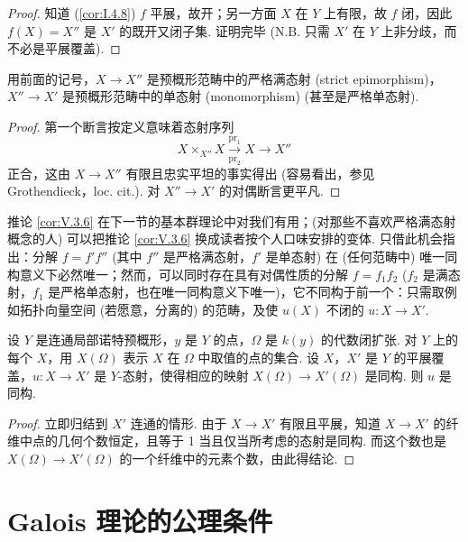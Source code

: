 \begin{proof}
知道 (\ref{cor:I.4.8}) $f$ 平展，故开；另一方面 $X$ 在 $Y$ 上有限，故 $f$ 闭，因此 $f(X) = X''$ 是 $X'$ 的既开又闭子集. 证明完毕 (N.B. 只需 $X'$ 在 $Y$ 上非分歧，而不必是平展覆盖).
\end{proof}

\begin{corollary}\label{cor:V.3.6}
用前面的记号，$X \to X''$ 是预概形范畴中的严格满态射 (strict epimorphism)，$X'' \to X'$ 是预概形范畴中的单态射 (monomorphism) (甚至是严格单态射).
\end{corollary}

\begin{proof}
第一个断言按定义意味着态射序列
\[
X \times_{X''} X \xrightarrow[\mathrm{pr}_2]{\mathrm{pr}_1} X \longrightarrow X''
\]
正合，这由 $X \to X''$ 有限且忠实平坦的事实得出 (容易看出，参见 Grothendieck，loc. cit.). 对 $X'' \to X'$ 的对偶断言更平凡.
\end{proof}

推论 \ref{cor:V.3.6} 在下一节的基本群理论中对我们有用；(对那些不喜欢严格满态射概念的人) 可以把推论 \ref{cor:V.3.6} 换成读者按个人口味安排的变体. 只借此机会指出：分解 $f = f'f''$ (其中 $f''$ 是严格满态射，$f'$ 是单态射) 在 (任何范畴中) 唯一同构意义下必然唯一；然而，可以同时存在具有对偶性质的分解 $f = f_1 f_2$ ($f_2$ 是满态射，$f_1$ 是严格单态射，也在唯一同构意义下唯一)，它不同构于前一个：只需取例如拓扑向量空间 (若愿意，分离的) 的范畴，及使 $u(X)$ 不闭的 $u \colon X \to X'$.

\begin{proposition}\label{prop:V.3.7}
设 $Y$ 是连通局部诺特预概形，$y$ 是 $Y$ 的点，$\Omega$ 是 $k(y)$ 的代数闭扩张. 对 $Y$ 上的每个 $X$，用 $X(\Omega)$ 表示 $X$ 在 $\Omega$ 中取值的点的集合. 设 $X$，$X'$ 是 $Y$ 的平展覆盖，$u \colon X \to X'$ 是 $Y$-态射，使得相应的映射 $X(\Omega) \to X'(\Omega)$ 是同构. 则 $u$ 是同构.
\end{proposition}

\begin{proof}
立即归结到 $X'$ 连通的情形. 由于 $X \to X'$ 有限且平展，知道 $X \to X'$ 的纤维中点的几何个数恒定，且等于 1 当且仅当所考虑的态射是同构. 而这个数也是 $X(\Omega) \to X'(\Omega)$ 的一个纤维中的元素个数，由此得结论.
\end{proof}

\section{Galois 理论的公理条件}

